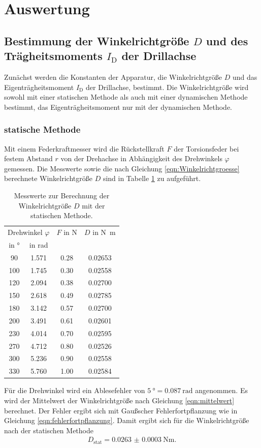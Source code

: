 \section{Auswertung}
\label{sec:Auswertung}
\subsection{Bestimmung der Winkelrichtgröße $D$ und des Trägheitsmoments
$I_\text{D}$ der Drillachse}
Zunächst werden die Konstanten der Apparatur, die Winkelrichtgröße $D$ und das
Eigenträgheitsmoment $I_\text{D}$ der Drillachse, bestimmt. Die Winkelrichtgröße
wird sowohl mit einer statischen Methode als auch mit einer dynamischen Methode
bestimmt, das Eigenträgheitsmoment nur mit der dynamischen Methode.

\subsubsection{statische Methode}
Mit einem Federkraftmesser wird die Rückstellkraft $F$ der Torsionsfeder bei festem
Abstand $r$ von der Drehachse in Abhängigkeit des Drehwinkels $\varphi$ gemessen.
Die Messwerte sowie die nach Gleichung \eqref{eqn:Winkelrichtgroesse} berechnete
Winkelrichtgröße $D$ sind in Tabelle \ref{tab:statisch} zu aufgeführt.
\begin{table}[H]
  \centering
  \begin{tabular}{c c c c}
    \toprule
    \multicolumn{2}{c}{Drehwinkel $\varphi$} & $F$ in \si{\newton} & $D$ in \si{\newton\meter} \\
    in \si{\degree} & in \si{\radian} & & \\
    \midrule
    90  & 1.571 & 0.28 & 0.02653 \\
    100 & 1.745 & 0.30 & 0.02558 \\
    120 & 2.094 & 0.38 & 0.02700 \\
    150 & 2.618 & 0.49 & 0.02785 \\
    180 & 3.142 & 0.57 & 0.02700 \\
    200 & 3.491 & 0.61 & 0.02601 \\
    230 & 4.014 & 0.70 & 0.02595 \\
    270 & 4.712 & 0.80 & 0.02526 \\
    300 & 5.236 & 0.90 & 0.02558 \\
    330 & 5.760 & 1.00 & 0.02584 \\
    \bottomrule
  \end{tabular}
  \caption{Messwerte zur Berechnung der Winkelrichtgröße $D$ mit der statischen
  Methode.}
  \label{tab:statisch}
\end{table}
\noindent Für die Drehwinkel wird ein Ablesefehler von $\SI{5}{\degree} = \SI{0.087}{\radian}$
angenommen. Es wird der Mittelwert der Winkelrichtgröße nach Gleichung
\eqref{eqn:mittelwert} berechnet. Der Fehler ergibt sich mit Gaußscher
Fehlerfortpflanzung wie in Gleichung \eqref{eqn:fehlerfortpflanzung}. Damit ergibt
sich für die Winkelrichtgröße nach der statischen Methode
\begin{align*}
  D_\text{stat} = \SI{0.0263(3)}{\newton\meter}.
\end{align*}

